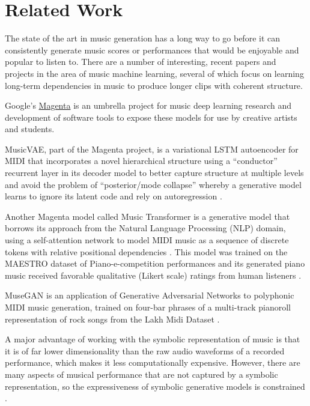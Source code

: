 \documentclass[sigconf,authorversion]{acmart}
\begin{document}
\section{Related Work}

The state of the art in music generation has a long way to go before
it can consistently generate music scores or performances that would
be enjoyable and popular to listen to. There are a number of
interesting, recent papers and projects in the area of music machine
learning, several of which focus on learning long-term dependencies in
music to produce longer clips with coherent structure.

Google's \href{https://magenta.tensorflow.org/}{Magenta} is an
umbrella project for music deep learning research and development of
software tools to expose these models for use by creative artists and
students.

MusicVAE, part of the Magenta project, is a variational LSTM
autoencoder for MIDI that incorporates a novel hierarchical structure
using a ``conductor'' recurrent layer in its decoder model to better
capture structure at multiple levels and avoid the problem of
``posterior/mode collapse'' whereby a generative model learns to
ignore its latent code and rely on autoregression
\cite{roberts_hierarchical_2018}.

Another Magenta model called Music Transformer is a generative model
that borrows its approach from the Natural Language Processing (NLP)
domain, using a self-attention network to model MIDI music as a
sequence of discrete tokens with relative positional dependencies
\cite{huang_music_2018}. This model was trained on the MAESTRO dataset
of Piano-e-competition performances \cite{hawthorne2019enabling} and
its generated piano music received favorable qualitative (Likert
scale) ratings from human listeners \cite{huang_music_2018}.

MuseGAN \cite{dong2017musegan} is an application of Generative Adversarial
Networks to polyphonic MIDI music generation, trained on four-bar phrases of a
multi-track pianoroll representation of rock songs from the Lakh Midi Dataset
\cite{raffel_learning-based_2016}.

A major advantage of working with the symbolic representation of music is that
it is of far lower dimensionality than the raw audio waveforms of a recorded
performance, which makes it less computationally expensive. However, there are
many aspects of musical performance that are not captured by a symbolic
representation, so the expressiveness of symbolic generative models is
constrained \cite{manzelli_conditioning_2018}.
\end{document}
